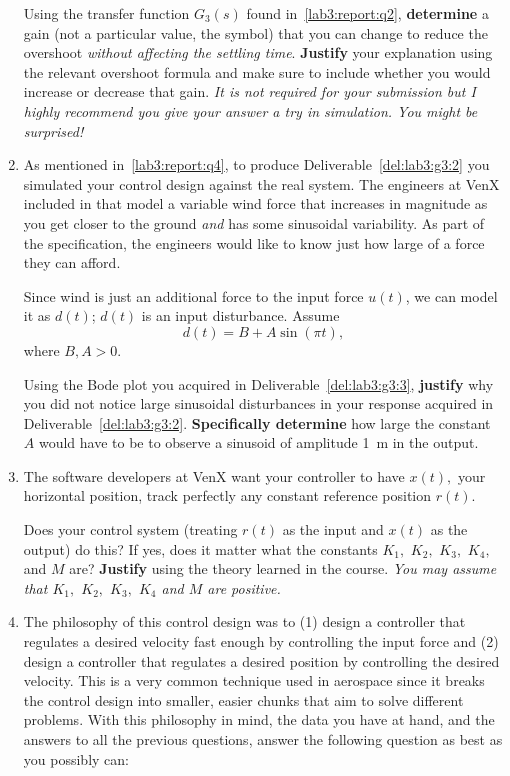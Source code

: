 \begin{deliverable}[label={lab3:report}]
\begin{enumerate}[label={(\arabic*)}]
{      Using the transfer function \(G_3(s)\) found in~\ref{lab3:report:q2}, 
      \textbf{determine} a gain (not a particular value, the symbol) that you can change to reduce the overshoot \emph{without affecting the settling time}.
      \textbf{Justify} your explanation using the relevant overshoot formula and make sure to include whether you would increase or decrease that gain.
      \emph{It is not required for your submission but I highly recommend you give your answer a try in simulation. You might be surprised!}
      \label{lab3:report:q4}
    }
    \item{%
      As mentioned in~\ref{lab3:report:q4}, to produce Deliverable~\ref{del:lab3:g3:2} you simulated your control design against the real system.
      The engineers at VenX included in that model a variable wind force that increases in magnitude as you get closer to the ground \emph{and} has some sinusoidal variability.
      As part of the specification, the engineers would like to know just how large of a force they can afford.

      Since wind is just an additional force to the input force \(u(t)\), we can model it as \(d(t)\);
      \(d(t)\) is an input disturbance.
      Assume
      \[
        d(t) = B + A\sin\left(\pi t\right),
      \]
      where \(B, A > 0\).

      Using the Bode plot you acquired in Deliverable~\ref{del:lab3:g3:3},
      \textbf{justify} why you did not notice large sinusoidal disturbances in your response acquired in Deliverable~\ref{del:lab3:g3:2}.
      \textbf{Specifically determine} how large the constant \(A\) would have to be to observe a sinusoid of amplitude \SI{1}{m} in the output.
      \label{lab3:report:q5}
    }
    \item{%
      The software developers at VenX want your controller to have \(x(t),\) your horizontal position, track perfectly any constant reference position \(r(t).\)

      Does your control system (treating \(r(t)\) as the input and \(x(t)\) as the output) do this?
      If yes, does it matter what the constants \(K_1,\) \(K_2,\) \(K_3,\) \(K_4,\) and \(M\) are?
      \textbf{Justify} using the theory learned in the course.
      \emph{You may assume that \(K_1,\) \(K_2,\) \(K_3,\) \(K_4\) and \(M\) are positive.}
      \label{lab3:report:q6}
    }
    \item{%
      The philosophy of this control design was to (1) design a controller that regulates a desired velocity fast enough by controlling the input force and (2) design a controller that regulates a desired position by controlling the desired velocity.
      This is a very common technique used in aerospace since it breaks the control design into smaller, easier chunks that aim to solve different problems.
      With this philosophy in mind, the data you have at hand, and the answers to all the previous questions, answer the following question as best as you possibly can:

}
\end{enumerate}
\end{deliverable}
